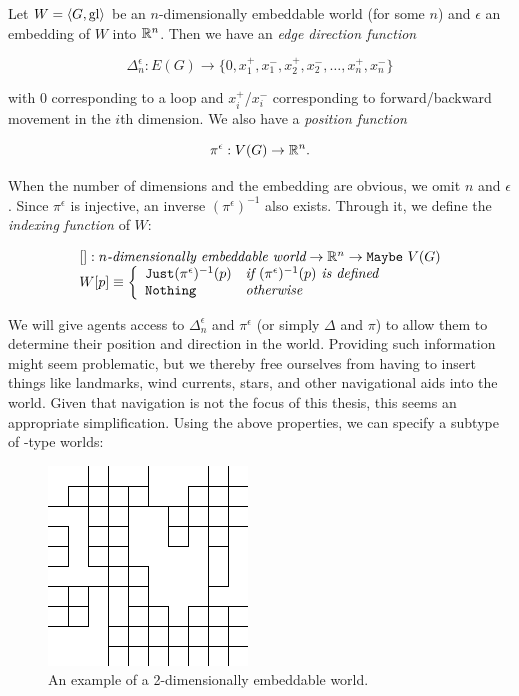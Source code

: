 \begin{definition}
Let $W = \langle G, \mathrm{gl} \rangle$ be an $n$-dimensionally embeddable world (for some $n$) and $\epsilon$ an embedding of $W$ into $\mathbb{R}^n$. Then we have an {\em edge direction function} 

$$\Delta_n^\epsilon : E(G) \rightarrow \{0,x_1^+,x_1^-,x_2^+,x_2^-,\dots,x_n^+,x_n^-\}$$

with $0$ corresponding to a loop and $x_i^+$/$x_i^-$ corresponding to forward/backward movement in the $i$th dimension. We also have a {\em position function}

$$\pi^\epsilon : V(G) \rightarrow \mathbb{R}^n.$$

When the number of dimensions and the embedding are obvious, we omit $n$ and $\epsilon$.
Since $\pi^\epsilon$ is injective, an inverse $(\pi^\epsilon)^{-1}$ also exists. Through it, we define the {\em indexing function} of $W$:

$$
	\begin{array}{l}
		[] : n\textit{-dimensionally embeddable world} \rightarrow \mathbb{R}^n \rightarrow \mathtt{Maybe}\ V(G)\\
		W[p] \equiv \left\{
			\begin{array}{l l}
				\mathtt{Just } (\pi^\epsilon)^{-1}(p) & \textit{if } (\pi^\epsilon)^{-1}(p) \textit{ is defined}\\
				\mathtt{Nothing} & \textit{otherwise}
			\end{array}
			\right.
	\end{array}
$$
\end{definition}

We will give agents access to $\Delta_n^\epsilon$ and $\pi^\epsilon$ (or simply $\Delta$ and $\pi$) to allow them to determine their position and direction in the world. Providing such information might seem problematic, but we thereby free ourselves from having to insert things like landmarks, wind currents, stars, and other navigational aids into the world. Given that navigation is not the focus of this thesis, this seems an appropriate simplification. Using the above properties, we can specify a subtype of \wext-type worlds:

\begin{figure}
	\centering
	\includegraphics{figs/2dgrid.png}
	\caption{An example of a 2-dimensionally embeddable world.}
	\label{fig:2dgrid}
\end{figure}

